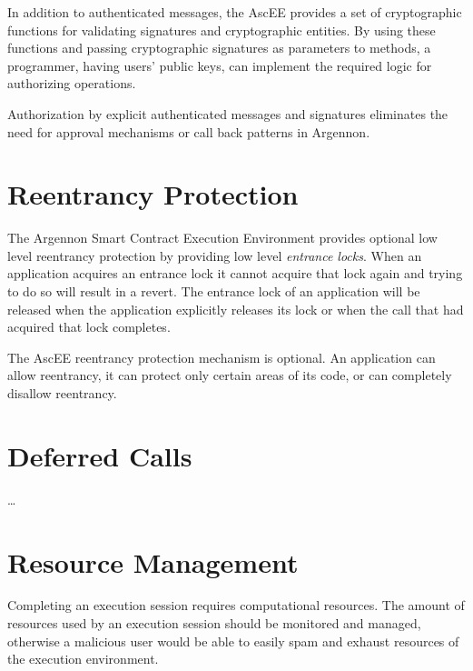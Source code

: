 In addition to authenticated messages, the AscEE provides a set of
cryptographic functions for validating signatures and cryptographic entities. By using these functions and
passing cryptographic signatures as parameters to methods, a programmer, having users' public keys, can implement
the required logic for authorizing operations.

Authorization by explicit authenticated messages and signatures eliminates the need for approval mechanisms or call back
patterns in Argennon.



\section{Reentrancy Protection}\label{sec:reentrancy}

The Argennon Smart Contract Execution Environment provides optional low level reentrancy protection by providing low
level \emph{entrance locks}. When an application acquires an entrance lock it cannot acquire that lock again and trying
to do so will result in a revert. The entrance lock of an application will be released when the application explicitly
releases its lock or when the call that had acquired that lock completes.

The AscEE reentrancy protection mechanism is optional. An application can allow reentrancy, it can protect only certain
areas of its code, or can completely disallow reentrancy.


\section{Deferred Calls}\label{sec:deferred-calls}

\ldots


\section{Resource Management}\label{sec:res-man}

Completing an execution session requires computational resources. The amount of resources used by an execution session
should be monitored and managed, otherwise a malicious user would be able to easily spam and exhaust resources of the
execution environment.

